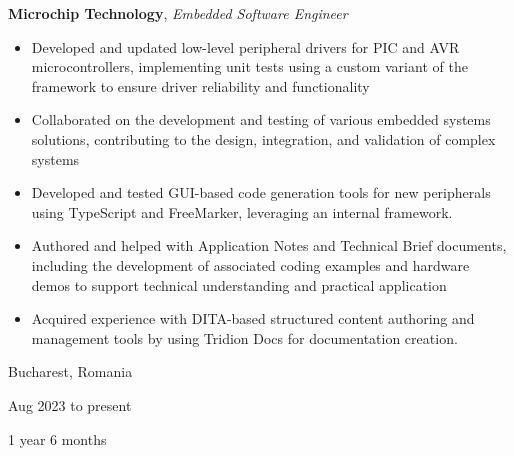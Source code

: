\documentclass[10pt, letterpaper]{article}
\newenvironment{highlights}{
    \begin{itemize}[
        topsep=0.10 cm,
        parsep=0.10 cm,
        partopsep=0pt,
        itemsep=0pt,
        leftmargin=0.4 cm + 10pt
    ]
}{
    \end{itemize}
} %
\newenvironment{twocolentry}[2][]{
    \onecolentry
    \def\secondColumn{#2}
    \setcolumnwidth{\fill, 3.5 cm}
    \begin{paracol}{2}
}{
    \switchcolumn \raggedleft \secondColumn
    \end{paracol}
    \endonecolentry
} %
\let\hrefWithoutArrow\href
\renewcommand{\href}[2]{\hrefWithoutArrow{#1}{\ifthenelse{\equal{#2}{}}{ }{#2 }\raisebox{.15ex}{\footnotesize \faExternalLink*}}}
\begin{document}
        
        \begin{twocolentry}{
            Bucharest, Romania

        Aug 2023 to present

        1 year 6 months
        }
            \textbf{Microchip Technology}, \textit{Embedded Software Engineer}
            \begin{highlights}
                \item Developed and updated low-level peripheral drivers for PIC and AVR microcontrollers, implementing unit tests using a custom variant of the \href{https://www.throwtheswitch.org/unity}{Unity} framework to ensure driver reliability and functionality
                \item Collaborated on the development and testing of various embedded systems solutions, contributing to the design, integration, and validation of complex systems
                \item Developed and tested GUI-based code generation tools for new peripherals using TypeScript and FreeMarker, leveraging an internal framework.
                \item Authored and helped with Application Notes and Technical Brief documents, including the development of associated coding examples and hardware demos to support technical understanding and practical application
                \item Acquired experience with DITA-based structured content authoring and management tools by using Tridion Docs for documentation creation.
            \end{highlights}
        \end{twocolentry}


        \vspace{0.2 cm}
\end{document}
